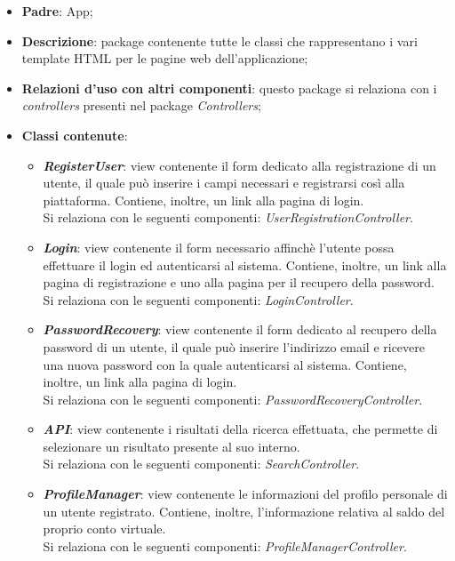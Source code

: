 \begin{itemize}
	\item \textbf{Padre}: App;
	
	\item \textbf{Descrizione}: package contenente tutte le classi che rappresentano i vari template HTML per le pagine web dell'applicazione;
	
	\item \textbf{Relazioni d’uso con altri componenti}: questo package si relaziona con i \textit{controllers} presenti nel package \textit{Controllers};
	
	\item \textbf{Classi contenute}:
	\begin{itemize}
		\item \textbf{\textit{RegisterUser}}: view contenente il form dedicato alla registrazione di un utente, il quale può inserire i campi necessari e registrarsi così alla piattaforma. Contiene, inoltre, un link alla pagina di login.\\
		Si relaziona con le seguenti componenti: \textit{UserRegistrationController}.
		
		\item \textbf{\textit{Login}}: view contenente il form necessario affinchè l'utente possa effettuare il login ed autenticarsi al sistema. Contiene, inoltre, un link alla pagina di registrazione e uno alla pagina per il recupero della password.\\
		Si relaziona con le seguenti componenti: \textit{LoginController}.
		
		\item \textbf{\textit{PasswordRecovery}}: view contenente il form dedicato al recupero della password di un utente, il quale può inserire l'indirizzo email e ricevere una nuova password con la quale autenticarsi al sistema. Contiene, inoltre, un link alla pagina di login.\\
		Si relaziona con le seguenti componenti: \textit{PasswordRecoveryController}.
		
		\item \textbf{\textit{API}}: view contenente i risultati della ricerca effettuata, che permette di selezionare un risultato presente al suo interno.\\
		Si relaziona con le seguenti componenti: \textit{SearchController}.
		
		\item \textbf{\textit{ProfileManager}}: view contenente le informazioni del profilo personale di un utente registrato. Contiene, inoltre, l'informazione relativa al saldo del proprio conto virtuale.\\
		Si relaziona con le seguenti componenti: \textit{ProfileManagerController}.
		

\end{itemize}
\end{itemize}
